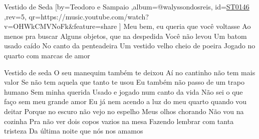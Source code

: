 \beginsong
{Vestido de Seda %
}[by={Teodoro e Sampaio %
},album={@walyssondosreis},
id={\href{https://music.youtube.com/watch?v=OHWkCMVNoFk&feature=share %
}{ST0146 %
}},rev={5}, %
qr={https://music.youtube.com/watch?v=OHWkCMVNoFk&feature=share %
}]
\beginverse 
Meu bem, eu queria que você voltasse
Ao menos pra buscar
Alguns objetos, que na despedida
Você não levou
Um batom usado caído
No canto da penteadeira
Um vestido velho cheio de poeira
Jogado no quarto com marcas de amor
\endverse

\beginchorus
Vestido de seda
O seu manequim também te deixou
Aí no cantinho não tem mais valor
Se não tem aquela que tanto te usou
Eu também não passo de um trapo humano
Sem minha querida
Usado e jogado num canto da vida
Não sei o que faço sem meu grande amor
\endchorus
{}
\beginverse 
Eu já nem acendo a luz do meu quarto
quando vou deitar
Porque no escuro não vejo no espelho
Meus olhos chorando
Não vou na cozinha
Pra não ver dois copos vazios na mesa
Fazendo lembrar com tanta tristeza
Da última noite que nós nos amamos
\endverse
{}

